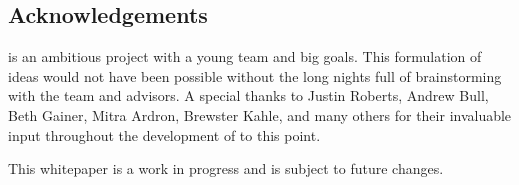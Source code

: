 \documentclass{kwp-builder}
\begin{document}
\subsection{Acknowledgements}

\tab \konjure is an ambitious project with a young team and big goals. This formulation of ideas would not have been possible without the long nights full of brainstorming with the \konjure team and advisors. A special thanks to Justin Roberts, Andrew Bull, Beth Gainer, Mitra Ardron, Brewster Kahle, and many others for their invaluable input throughout the development of \konjure to this point.\bigskip

This whitepaper is a work in progress and is subject to future changes.
\end{document}

